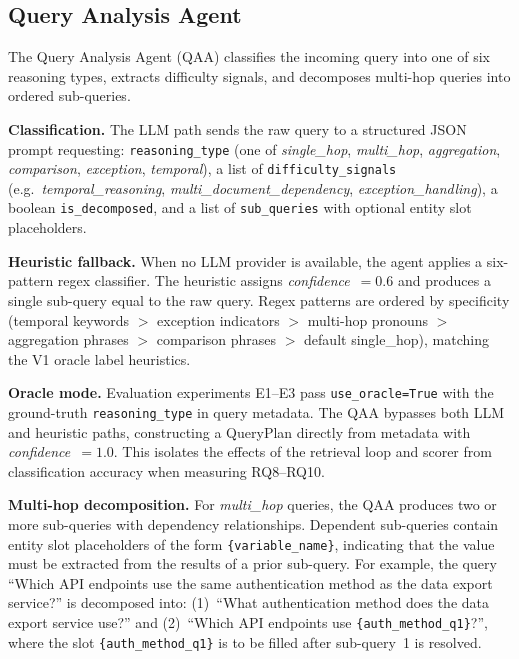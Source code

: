 \subsection{Query Analysis Agent}
\label{subsec:v2_qa}

The Query Analysis Agent (QAA) classifies the incoming query into one of six
reasoning types, extracts difficulty signals, and decomposes multi-hop queries
into ordered sub-queries.

\textbf{Classification.} The LLM path sends the raw query to a structured JSON
prompt requesting: \texttt{reasoning\_type} (one of \textit{single\_hop},
\textit{multi\_hop}, \textit{aggregation}, \textit{comparison},
\textit{exception}, \textit{temporal}), a list of \texttt{difficulty\_signals}
(e.g.\ \textit{temporal\_reasoning}, \textit{multi\_document\_dependency},
\textit{exception\_handling}), a boolean \texttt{is\_decomposed}, and a list
of \texttt{sub\_queries} with optional entity slot placeholders.

\textbf{Heuristic fallback.} When no LLM provider is available, the agent
applies a six-pattern regex classifier. The heuristic assigns
\textit{confidence}~$= 0.6$ and produces a single sub-query equal to the raw
query. Regex patterns are ordered by specificity (temporal keywords $>$
exception indicators $>$ multi-hop pronouns $>$ aggregation phrases $>$
comparison phrases $>$ default single\_hop), matching the V1 oracle label
heuristics.

\textbf{Oracle mode.} Evaluation experiments E1--E3 pass
\texttt{use\_oracle=True} with the ground-truth \texttt{reasoning\_type} in
query metadata. The QAA bypasses both LLM and heuristic paths, constructing a
QueryPlan directly from metadata with \textit{confidence}~$= 1.0$. This
isolates the effects of the retrieval loop and scorer from classification
accuracy when measuring RQ8--RQ10.

\textbf{Multi-hop decomposition.} For \textit{multi\_hop} queries, the QAA
produces two or more sub-queries with dependency relationships. Dependent
sub-queries contain entity slot placeholders of the form
\texttt{\{variable\_name\}}, indicating that the value must be extracted from
the results of a prior sub-query. For example, the query ``Which API endpoints
use the same authentication method as the data export service?'' is decomposed
into: (1)~``What authentication method does the data export service use?'' and
(2)~``Which API endpoints use \texttt{\{auth\_method\_q1\}}?'', where the slot
\texttt{\{auth\_method\_q1\}} is to be filled after sub-query~1 is resolved.


